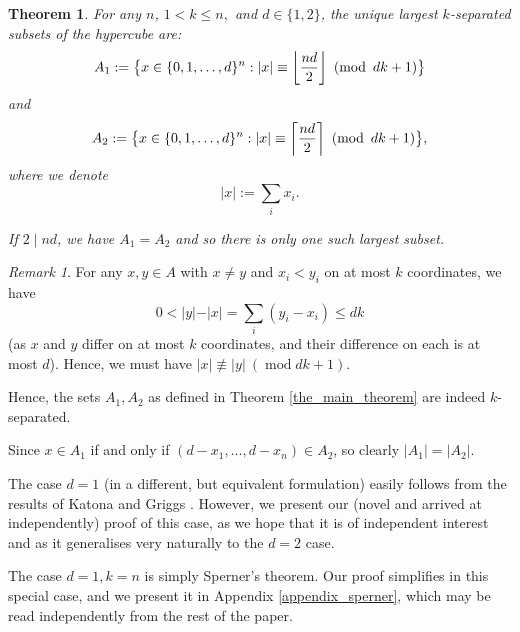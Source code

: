 \documentclass[11pt, reqno]{amsart}
\newcommand{\leanblueprintbase}{https://mj141592.github.io/weighted-chains-paper}
\newif\ifleanlinks
\newcommand{\leanblueprint}[1]{%
  \ifleanlinks
    \leavevmode\unskip\penalty9999\hbox{}\nobreak\hfill\quad
    \href{\leanblueprintbase/theorems/#1/}{%
      \mbox{\normalfont\footnotesize\textcolor{blue}{[\textsf{Lean formalisation}]}}}%
    \par\nobreak
  \fi
}
\newtheorem{theorem}{Theorem}[section]
\theoremstyle{remark}
\newtheorem*{remark}{Remark}
\numberwithin{equation}{section}
\newcommand{\thehypercube}{\{0, 1, \ldots, d\}^n}
\newcommand\modd{\operatorname{mod}}
\newcommand{\fclass}{\mathchoice
  {\left\lfloor \frac{nd}{2} \right\rfloor}
  {\big\lfloor \frac{nd}{2} \big\rfloor}
  {\big\lfloor \frac{nd}{2} \big\rfloor}
  {\big\lfloor \frac{nd}{2} \big\rfloor}}
\newcommand{\cclass}{\mathchoice
  {\left\lceil \frac{nd}{2} \right\rceil}
  {\big\lceil \frac{nd}{2} \big\rceil}
  {\big\lceil \frac{nd}{2} \big\rceil}
  {\big\lceil \frac{nd}{2} \big\rceil}}
\begin{document}
\begin{theorem}
\label{wc:thm:main-theorem}
\label{the_main_theorem}
For any $n$, $1 < k \leqslant n,$ and $d \in \{1, 2\}$, the unique largest $k$-separated subsets of the hypercube are:
\begin{equation}
    A_1 := \big\{x \in \thehypercube: \vert x\vert  \equiv \fclass \ (\modd \ dk+1) \big\}
\end{equation}
and
\begin{equation}
    A_2 := \big\{x \in \thehypercube: \vert x\vert  \equiv \cclass \ (\modd \ dk+1) \big\},
\end{equation}
where we denote
\begin{equation*}
    \vert x\vert  := \sum_i x_i.
\end{equation*}

If $2 \mid nd$, we have $A_1=A_2$ and so there is only one such largest subset.
\leanblueprint{main-theorem}
\end{theorem}

\begin{remark}
    For any $x, y \in A$ with $x \neq y$ and $x_i < y_i$ on at most $k$ coordinates, we have
    \begin{equation*}
        0 < \vert y\vert -\vert x\vert  = \sum_i (y_i-x_i) \leqslant dk
    \end{equation*}
    (as $x$ and $y$ differ on at most $k$ coordinates, and their difference on each is at most $d$). Hence, we must have $\vert x\vert  \not\equiv \vert y\vert  \ (\modd dk+1)$.

    Hence, the sets $A_1, A_2$ as defined in Theorem \ref{the_main_theorem} are indeed $k$-separated.

    Since $x \in A_1$ if and only if $(d-x_1, \ldots, d-x_n) \in A_2$, so clearly $\vert A_1\vert =\vert A_2\vert $.
\end{remark}

The case $d=1$ (in a different, but equivalent formulation) easily follows from the results of Katona \cite{katona} and Griggs \cite{griggs}. However, we present our (novel and arrived at independently) proof of this case, as we hope that it is of independent interest and as it generalises very naturally to the $d=2$ case.

The case $d=1, k=n$ is simply Sperner's theorem. Our proof simplifies in this special case, and we present it in Appendix \ref{appendix_sperner}, which may be read independently from the rest of the paper.
\end{document}
